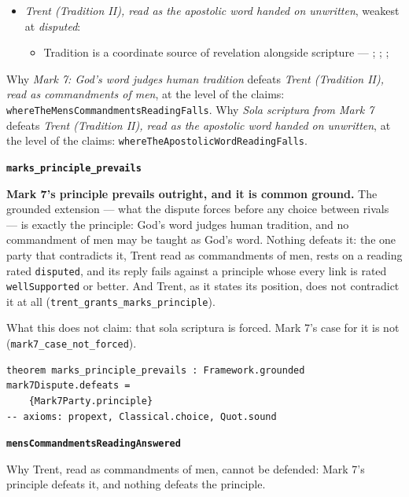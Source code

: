 \documentclass[11pt]{article}
\begin{document}
\begin{itemize}
\begin{itemize}
\item an inference step --- \cite[IV.x.23]{calvin-institutes-1960}
\end{itemize}
\item \emph{Trent (Tradition II), read as the apostolic word handed on unwritten}, weakest at \emph{disputed}:
\begin{itemize}
\item Tradition is a coordinate source of revelation alongside scripture --- \cite[Trent, Session IV (1546), Decree on Sacred Books and Traditions]{tanner-decrees-1990}; \cite{mathison-shape-sola-scriptura-2001}; \cite{geiselmann-meaning-of-tradition-1966}; \cite{congar-tradition-and-traditions-1966}
\end{itemize}
\end{itemize}
\noindent Why \emph{Mark 7: God's word judges human tradition} defeats \emph{Trent (Tradition II), read as commandments of men}, at the level of the claims: \texttt{where\allowbreak{}The\allowbreak{}Mens\allowbreak{}Commandments\allowbreak{}Reading\allowbreak{}Falls}.
\noindent Why \emph{Sola scriptura from Mark 7} defeats \emph{Trent (Tradition II), read as the apostolic word handed on unwritten}, at the level of the claims: \texttt{where\allowbreak{}The\allowbreak{}Apostolic\allowbreak{}Word\allowbreak{}Reading\allowbreak{}Falls}.
\par\medskip\noindent\textbf{\texttt{marks\_\allowbreak{}principle\_\allowbreak{}prevails}}\par\nobreak\noindent
\textbf{Mark 7's principle prevails outright, and it is common ground.} The grounded extension — what the dispute forces before any choice between rivals — is exactly the principle: God's word judges human tradition, and no commandment of men may be taught as God's word. Nothing defeats it: the one party that contradicts it, Trent read as commandments of men, rests on a reading rated \texttt{disputed}, and its reply fails against a principle whose every link is rated \texttt{well\allowbreak{}Supported} or better. And Trent, as it states its position, does not contradict it at all (\texttt{trent\_\allowbreak{}grants\_\allowbreak{}marks\_\allowbreak{}principle}).

What this does not claim: that sola scriptura is forced. Mark 7's case for it is not (\texttt{mark7\_\allowbreak{}case\_\allowbreak{}not\_\allowbreak{}forced}).

{\small\begin{verbatim}
theorem marks_principle_prevails : Framework.grounded mark7Dispute.defeats =
    {Mark7Party.principle}
-- axioms: propext, Classical.choice, Quot.sound
\end{verbatim}}
\par\medskip\noindent\textbf{\texttt{mens\allowbreak{}Commandments\allowbreak{}Reading\allowbreak{}Answered}}\par\nobreak\noindent
Why Trent, read as commandments of men, cannot be defended: Mark 7's principle defeats it, and nothing defeats the principle.
\end{document}
